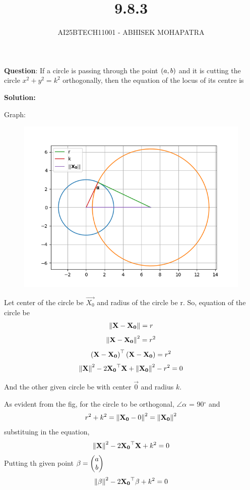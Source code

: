 \documentclass{beamer}
\title{9.8.3}
\author{AI25BTECH11001 - ABHISEK MOHAPATRA}
\numberwithin{equation}{section}
\begin{document}
{\let\newpage\relax\maketitle}
\renewcommand{\thefigure}{\theenumi}
\renewcommand{\thetable}{\theenumi}



	 	\textbf{Question}:
If a circle is passing through the point $\left(a, b\right)$ and it is cutting the circle $x^2 + y^2 = k^2$ orthogonally, then the equation of the locus of its centre is
		
		\textbf{Solution:}

	Graph:
\begin{figure}[h!]
	\centering
	\includegraphics[width=0.55\linewidth]{img.png}
\end{figure}

Let center of the circle be $\vec{X_0}$ and radius of the circle be r.
So, equation of the circle be
\begin{align}
		\left\lVert\mathbf{X}-\mathbf{X_0}\right\rVert = r
\end{align}
\begin{align}
		\left\lVert\mathbf{X}-\mathbf{X_0}\right\rVert^2 = r^2
\end{align}
\begin{align}
		\left(\mathbf{X}-\mathbf{X_0}\right)^\top\left(\mathbf{X}-\mathbf{X_0}\right) = r^2
\end{align}
\begin{align}
		\left\lVert\mathbf{X}\right\rVert^2-2\mathbf{X_0}^\top \mathbf{X}+\left\lVert\mathbf{X_0}\right\rVert^2-r^2 = 0
\end{align}

And the other given circle be with center $\vec{0}$ and radius $k$.

As evident from the fig, for the circle to be orthogonal, $\angle\alpha$ = 90$^\circ$ and
\begin{align}
		r^2 + k^2 = \left\lVert\mathbf{X_0} - 0\right\rVert^2= \left\lVert\mathbf{X_0}\right\rVert^2
\end{align}
substituing in the equation,
\begin{align}
		\left\lVert\mathbf{X}\right\rVert^2-2\mathbf{X_0}^\top \mathbf{X}+k^2 = 0
\end{align}
Putting th given point $\mathbf{\beta} = \begin{pmatrix}a\\b\end{pmatrix}$
\begin{align}
		\left\lVert\mathbf{\beta}\right\rVert^2-2\mathbf{X_0}^\top \mathbf{\beta}+k^2 = 0
\end{align}
\end{document}
